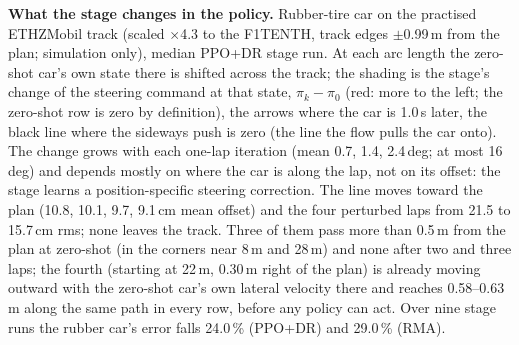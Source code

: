 \caption{\textbf{What the stage changes in the policy.} Rubber-tire car on the practised ETHZMobil track (scaled $\times$4.3 to the
F1TENTH, track edges $\pm$0.99\,m from the plan; simulation only), median PPO+DR stage run. At each arc length the zero-shot car's own
state there is shifted across the track; the shading is the stage's change of the steering command at that state, $\pi_k - \pi_0$ (red:
more to the left; the zero-shot row is zero by definition), the arrows where the car is 1.0\,s later, the black line where the sideways
push is zero (the line the flow pulls the car onto). The change grows with each one-lap iteration (mean 0.7, 1.4, 2.4\,deg; at most
16\,deg) and depends mostly on where the car is along the lap, not on its offset: the stage learns a position-specific steering
correction. The line moves toward the plan (10.8, 10.1, 9.7, 9.1\,cm mean offset) and the four perturbed laps from 21.5 to 15.7\,cm rms;
none leaves the track. Three of them pass more than 0.5\,m from the plan at zero-shot (in the corners near 8\,m and 28\,m) and none after
two and three laps; the fourth (starting at 22\,m, 0.30\,m right of the plan) is already moving outward with the zero-shot car's own
lateral velocity there and reaches 0.58--0.63\,m along the same path in every row, before any policy can act. Over nine stage runs the
rubber car's error falls 24.0\,\% (PPO+DR) and 29.0\,\% (RMA).}
